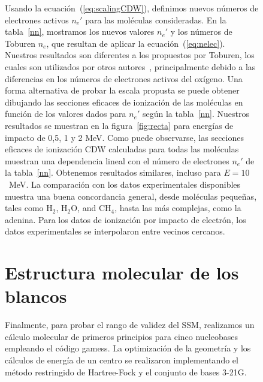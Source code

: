 \begin{figure}
Usando la ecuación~(\ref{eq:scalingCDW}), definimos nuevos números de 
electrones activos $n_e'$ para las moléculas consideradas. En la 
tabla~\ref{nn}, mostramos los nuevos valores $n_e'$ y los números de 
Toburen $n_e$, que resultan de aplicar la ecuación~(\ref{eq:nelec}). 
Nuestros resultados son diferentes a los propuestos por Toburen, los 
cuales son utilizados por otros autores~\cite{itoh2013}, principalmente 
debido a las diferencias en los números de electrones activos del 
oxígeno. Una forma alternativa de probar la escala propusta se puede
obtener dibujando las secciones eficaces de ionización de las moléculas 
en función de los valores dados para $n_e'$ según la tabla~\ref{nn}. 
Nuestros resultados se muestran en la figura~\ref{fig:recta} para 
energías de impacto de 0,5, 1 y 2 MeV. Como puede observarse, las 
secciones eficaces de ionización CDW calculadas para todas las moléculas 
muestran una dependencia lineal con el número de electrones $n_e'$ de 
la tabla~\ref{nn}. Obtenemos resultados similares, incluso para 
$E=10$~MeV. La comparación con los datos experimentales disponibles 
muestra una buena concordancia general, desde moléculas pequeñas, tales
como H$_2$, H$_2$O, and CH$_4$, hasta las más complejas, como la adenina. 
Para los datos de ionización por impacto de electrón, los datos 
experimentales se interpolaron entre vecinos cercanos. 


\section{Estructura molecular de los blancos}
\label{sec:molcalculations}

Finalmente, para probar el rango de validez del SSM, realizamos un 
cálculo molecular de primeros principios para cinco nucleobases 
empleando el código {\sc gamess}. La optimización de la geometría y los 
cálculos de energía de un centro se realizaron implementando el método
restringido de Hartree-Fock y el conjunto de bases 3-21G. 


\end{figure}
